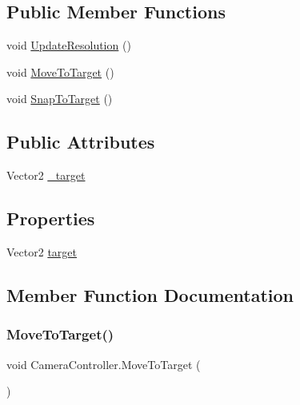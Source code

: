 \subsection*{Public Member Functions}
\begin{DoxyCompactItemize}
\item 
void \mbox{\hyperlink{class_camera_controller_a4894dc3111b871a8bf5ff422d30c1689}{Update\+Resolution}} ()
\item 
void \mbox{\hyperlink{class_camera_controller_a79831008bb764801df46a3c91343a524}{Move\+To\+Target}} ()
\item 
void \mbox{\hyperlink{class_camera_controller_a9e2d7df7c696c1c2ce48384933c5d1ab}{Snap\+To\+Target}} ()
\end{DoxyCompactItemize}
\subsection*{Public Attributes}
\begin{DoxyCompactItemize}
\item 
Vector2 \mbox{\hyperlink{class_camera_controller_ac211a3ef97d78311cab3215e02dcaa8e}{\+\_\+target}}
\end{DoxyCompactItemize}
\subsection*{Properties}
\begin{DoxyCompactItemize}
\item 
Vector2 \mbox{\hyperlink{class_camera_controller_a1557d6d0a4b70b6bb53f5a913329d0d0}{target}}
\end{DoxyCompactItemize}


\subsection{Member Function Documentation}
\mbox{\label{class_camera_controller_a79831008bb764801df46a3c91343a524}} 
\subsubsection{\texorpdfstring{MoveToTarget()}{MoveToTarget()}}
{\footnotesize\ttfamily void Camera\+Controller.\+Move\+To\+Target (\begin{DoxyParamCaption}{ }\end{DoxyParamCaption})}

